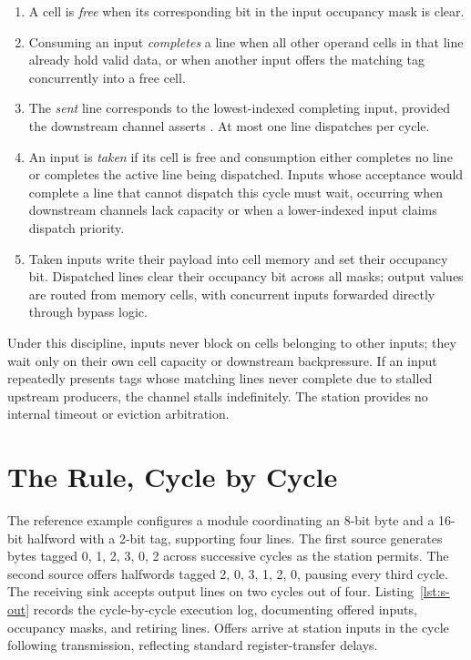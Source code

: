 \documentclass[journal,9pt]{IEEEtran}
\begin{document}
\begin{enumerate}
\item A cell is \emph{free} when its corresponding bit in the input occupancy
  mask is clear.
\item Consuming an input \emph{completes} a line when all other operand cells in
  that line already hold valid data, or when another input offers the matching
  tag concurrently into a free cell.
\item The \emph{sent} line corresponds to the lowest-indexed completing input,
  provided the downstream channel asserts . At most one line
  dispatches per cycle.
\item An input is \emph{taken} if its cell is free and consumption either
  completes no line or completes the active line being dispatched. Inputs whose
  acceptance would complete a line that cannot dispatch this cycle must wait,
  occurring when downstream channels lack capacity or when a lower-indexed
  input claims dispatch priority.
\item Taken inputs write their payload into cell memory and set their occupancy
  bit. Dispatched lines clear their occupancy bit across all masks; output
  values are routed from memory cells, with concurrent inputs forwarded
  directly through bypass logic.
\end{enumerate}

Under this discipline, inputs never block on cells belonging to other inputs;
they wait only on their own cell capacity or downstream backpressure. If an input
repeatedly presents tags whose matching lines never complete due to stalled
upstream producers, the channel stalls indefinitely. The station provides no
internal timeout or eviction arbitration.

\section{The Rule, Cycle by Cycle}
\label{sec:s-cycles}

The reference example configures a  module coordinating an 8-bit
byte and a 16-bit halfword with a 2-bit tag, supporting four lines. The first
source generates bytes tagged 0, 1, 2, 3, 0, 2 across successive cycles as the
station permits. The second source offers halfwords tagged 2, 0, 3, 1, 2, 0,
pausing every third cycle. The receiving sink accepts output lines on two
cycles out of four. Listing~\ref{lst:s-out} records the cycle-by-cycle execution
log, documenting offered inputs, occupancy masks, and retiring lines. Offers
arrive at station inputs in the cycle following transmission, reflecting
standard register-transfer delays.
\end{document}

